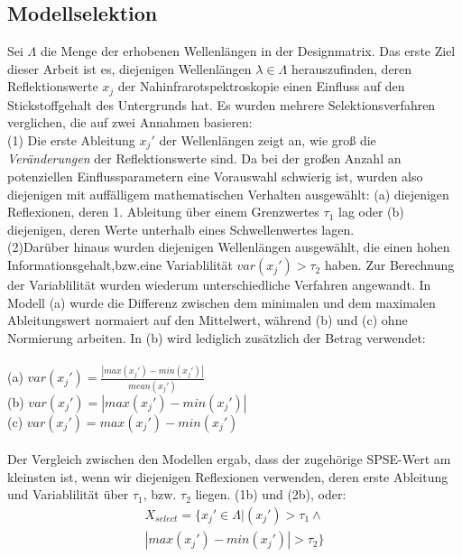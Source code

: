 	\subsection{Modellselektion}
	\label{ssec:modellselektion}
	Sei $\Lambda$ die Menge der erhobenen Wellenlängen in der Designmatrix.
	Das erste Ziel dieser Arbeit ist es, diejenigen Wellenlängen $\lambda\in\Lambda$ herauszufinden, deren Reflektionswerte $x_j$ der Nahinfrarotspektroskopie einen Einfluss auf den Stickstoffgehalt des Untergrunds hat.  Es wurden mehrere Selektionsverfahren verglichen, die auf zwei Annahmen basieren: \\
	(1) Die erste Ableitung $x_j'$ der Wellenlängen zeigt an, wie groß die \textit{Veränderungen} der Reflektionswerte sind. Da bei der großen Anzahl an potenziellen Einflussparametern eine Vorauswahl schwierig ist, wurden also diejenigen mit auffälligem mathematischen Verhalten ausgewählt: (a) diejenigen Reflexionen, deren 1. Ableitung über einem Grenzwertes $\tau_1$ lag oder (b) diejenigen, deren Werte unterhalb eines Schwellenwertes lagen.\\
	(2)Darüber hinaus wurden diejenigen Wellenlängen ausgewählt, die einen hohen Informationsgehalt,bzw.eine Variablilität $var(x_j') > \tau_2$ haben. Zur Berechnung der Variablilität wurden wiederum unterschiedliche Verfahren angewandt. In Modell (a) wurde die Differenz zwischen dem minimalen und dem maximalen Ableitungswert normaiert auf den Mittelwert, während (b) und (c) ohne Normierung arbeiten. In (b) wird lediglich zusätzlich der Betrag verwendet: 	\\ \\
	(a) $var(x_j') = \frac{|max(x_j') - min(x_j')|}{mean(x_j')}$\\
	(b) $var(x_j') = |max(x_j') - min(x_j')|$\\
	(c) $var(x_j')= max(x_j') - min(x_j')$\\ \\
	Der Vergleich zwischen den Modellen ergab, dass der zugehörige SPSE-Wert am kleinsten ist, wenn wir diejenigen Reflexionen verwenden, deren erste Ableitung und Variablilität über $\tau_1$, bzw. $\tau_2$ liegen. (1b) und (2b), oder:
	\begin{align*}
		X_{select} = \{x_j' \in \Lambda | (x_j') > \tau_1 \wedge \\|max(x_j') - min(x_j')| > \tau_2\}
	\end{align*}


